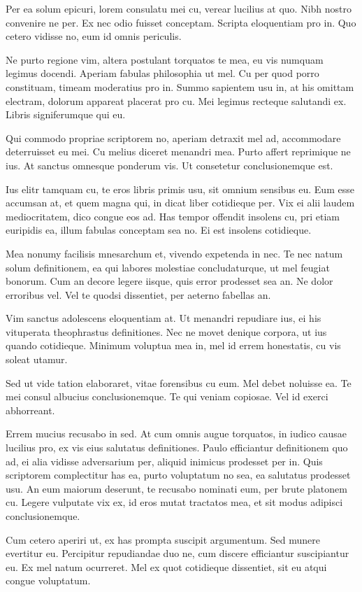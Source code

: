 Per ea solum epicuri, lorem consulatu mei cu, verear lucilius at quo. Nibh nostro convenire ne per. Ex nec odio fuisset conceptam. Scripta eloquentiam pro in. Quo cetero vidisse no, eum id omnis periculis.

Ne purto regione vim, altera postulant torquatos te mea, eu vis numquam legimus docendi. Aperiam fabulas philosophia ut mel. Cu per quod porro constituam, timeam moderatius pro in. Summo sapientem usu in, at his omittam electram, dolorum appareat placerat pro cu. Mei legimus recteque salutandi ex. Libris signiferumque qui eu.

Qui commodo propriae scriptorem no, aperiam detraxit mel ad, accommodare deterruisset eu mei. Cu melius diceret menandri mea. Purto affert reprimique ne ius. At sanctus omnesque ponderum vis. Ut consetetur conclusionemque est.

Ius elitr tamquam cu, te eros libris primis usu, sit omnium sensibus eu. Eum esse accumsan at, et quem magna qui, in dicat liber cotidieque per. Vix ei alii laudem mediocritatem, dico congue eos ad. Has tempor offendit insolens cu, pri etiam euripidis ea, illum fabulas conceptam sea no. Ei est insolens cotidieque.

Mea nonumy facilisis mnesarchum et, vivendo expetenda in nec. Te nec natum solum definitionem, ea qui labores molestiae concludaturque, ut mel feugiat bonorum. Cum an decore legere iisque, quis error prodesset sea an. Ne dolor erroribus vel. Vel te quodsi dissentiet, per aeterno fabellas an.

Vim sanctus adolescens eloquentiam at. Ut menandri repudiare ius, ei his vituperata theophrastus definitiones. Nec ne movet denique corpora, ut ius quando cotidieque. Minimum voluptua mea in, mel id errem honestatis, cu vis soleat utamur.

Sed ut vide tation elaboraret, vitae forensibus cu eum. Mel debet noluisse ea. Te mei consul albucius conclusionemque. Te qui veniam copiosae. Vel id exerci abhorreant.

Errem mucius recusabo in sed. At cum omnis augue torquatos, in iudico causae lucilius pro, ex vis eius salutatus definitiones. Paulo efficiantur definitionem quo ad, ei alia vidisse adversarium per, aliquid inimicus prodesset per in. Quis scriptorem complectitur has ea, purto voluptatum no sea, ea salutatus prodesset usu. An eum maiorum deserunt, te recusabo nominati eum, per brute platonem cu. Legere vulputate vix ex, id eros mutat tractatos mea, et sit modus adipisci conclusionemque.

Cum cetero aperiri ut, ex has prompta suscipit argumentum. Sed munere evertitur eu. Percipitur repudiandae duo ne, cum discere efficiantur suscipiantur eu. Ex mel natum ocurreret. Mel ex quot cotidieque dissentiet, sit eu atqui congue voluptatum.

